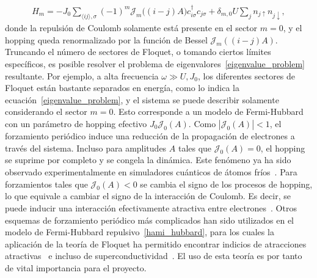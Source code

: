 \documentclass[a4paper,10pt]{article}
\begin{document}
\begin{align} \label{fourier_hami_terms}
H_m=-J_0\sum_{\langle ij\rangle,\sigma}(-1)^m\mathcal{J}_m\Big((i-j)A\Big)c_{i\sigma}^{\dagger}c_{j\sigma}+\delta_{m,0}U\sum_{j}n_{j\uparrow}n_{j\downarrow},
\end{align}
donde la repulsi\'on de Coulomb solamente est\'a presente en el sector $m=0$, y el hopping queda renormalizado por la funci\'on de Bessel $\mathcal{J}_m\left((i-j)A\right)$. Truncando el n\'umero de sectores de Floquet, o tomando ciertos l\'imites espec\'ificos, es posible resolver el problema de eigenvalores~\eqref{eigenvalue_problem} resultante. Por ejemplo, a alta frecuencia $\omega\gg U,J_0$, los diferentes sectores de Floquet est\'an bastante separados en energ\'ia, como lo indica la ecuaci\'on~\eqref{eigenvalue_problem}, y el sistema se puede describir solamente considerando el sector $m=0$. Esto corresponde a un modelo de Fermi-Hubbard con un par\'ametro de hopping efectivo $J_0\mathcal{J}_0(A)$. Como $|\mathcal{J}_0(A)|<1$, el forzamiento peri\'odico induce una reducci\'on de la propagaci\'on de electrones a trav\'es del sistema. Incluso para amplitudes $A$ tales que $\mathcal{J}_0(A)=0$, el hopping se suprime por completo y se congela la din\'amica. Este fen\'omeno ya ha sido observado experimentalmente en simuladores cu\'anticos de \'atomos fr\'ios~\cite{eckardt2017rmp}. Para forzamientos tales que $\mathcal{J}_0(A)<0$ se cambia el signo de los procesos de hopping, lo que equivale a cambiar el signo de la interacci\'on de Coulomb. Es decir, se puede inducir una interacci\'on efectivamente atractiva entre electrones~\cite{eckstein2014rmp,tsuji2011prl}. Otros esquemas de forzamiento peri\'odico m\'as complicados han sido utilizados en el modelo de Fermi-Hubbard repulsivo~\eqref{hami_hubbard}, para los cuales la aplicaci\'on de la teor\'ia de Floquet ha permitido encontrar indicios de atracciones atractivas~\cite{bukov2016prl,nosotros2017driven} e incluso de superconductividad~\cite{jonathan2016}. El uso de esta teor\'ia es por tanto de vital importancia para el proyecto.
\end{document}
